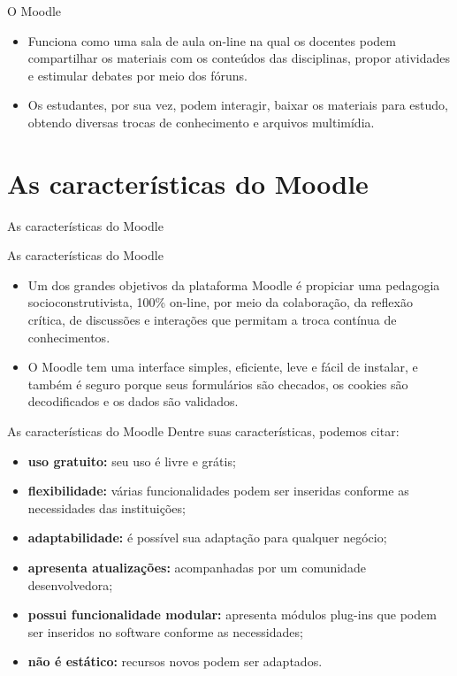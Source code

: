 \documentclass[11pt]{beamer}
\begin{document}
	\begin{frame}{O Moodle}

		\begin{itemize}
			\justifying
			\item Funciona como uma sala de aula on-line na qual os docentes podem compartilhar os materiais com os conteúdos das disciplinas, propor atividades e estimular debates por meio dos fóruns.
			\item Os estudantes, por sua vez, podem interagir, baixar os materiais para estudo, obtendo diversas trocas de conhecimento e arquivos multimídia.
		\end{itemize}
	\end{frame}
	
\section{As características do Moodle}

	\begin{frame}{As características do Moodle}
		\begin{block}{As características do Moodle}
			\begin{itemize}
				\justifying
				\item Um dos grandes objetivos da plataforma Moodle é propiciar uma pedagogia socioconstrutivista, 100\% on-line, por meio da colaboração, da reflexão crítica, de discussões e interações que permitam a troca contínua de conhecimentos. 
				
				\item O Moodle tem uma interface simples, eficiente, leve e fácil de instalar, e também é seguro porque seus formulários são checados, os cookies são decodificados e os dados são validados.
			\end{itemize}
		\end{block}
	\end{frame}
	
	\begin{frame}{As características do Moodle}
		\justifying Dentre suas características, podemos citar:
		
		\begin{itemize}
			\justifying
			\item \textbf{uso gratuito:}  seu uso é livre e grátis;
			\item \textbf{flexibilidade:}  várias funcionalidades podem ser inseridas conforme as necessidades das instituições; 
			\item \textbf{adaptabilidade:}  é possível sua adaptação para qualquer negócio;
			\item \textbf{apresenta atualizações:}  acompanhadas por um comunidade desenvolvedora;
			\item \textbf{possui funcionalidade modular: }  apresenta módulos plug-ins que podem ser inseridos no software conforme as necessidades;
			\item \textbf{não é estático:}  recursos novos podem ser adaptados.
		\end{itemize}
	\end{frame}
	
\end{document}
